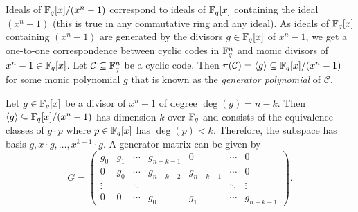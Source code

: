 \documentclass[../main.tex]{subfiles}
\begin{document}
Ideals of $\mathbb{F}_q[x] / (x^n - 1)$ correspond to ideals of $\mathbb{F}_q[x]$ containing the ideal $(x^n - 1)$ (this is true in any commutative ring and any ideal). As ideals of $\mathbb{F}_q[x]$ containing $(x^n - 1)$ are generated by the divisors $g \in \mathbb{F}_q[x]$ of $x^n - 1$, we get a one-to-one correspondence between cyclic codes in $\mathbb{F}_q^n$ and monic divisors of $x^n - 1 \in \mathbb{F}_q[x]$. Let $\mathcal{C} \subseteq \mathbb{F}_q^n$ be a cyclic code. Then $\pi(\mathcal{C}) = \langle g \rangle \subseteq \mathbb{F}_q[x] / (x^n - 1)$ for some monic polynomial $g$ that is known as the \emph{generator polynomial} of $\mathcal{C}$.

Let $g \in \mathbb{F}_q[x]$ be a divisor of $x^n - 1$ of degree $\deg(g) = n - k$. Then $\langle g \rangle \subseteq \mathbb{F}_q[x] / (x^n - 1)$ has dimension $k$ over $\mathbb{F}_q$ and consists of the equivalence classes of $g \cdot p$ where $p \in \mathbb{F}_q[x]$ has $\deg(p) < k$. Therefore, the subspace has basis $g, x \cdot g, \dots, x^{k - 1} \cdot g$. A generator matrix can be given by
\begin{equation*}
    G = \begin{pmatrix}
        g_0 & g_1 & \cdots & g_{n - k - 1} & 0 & \cdots & 0 \\
        0 & g_0 & \cdots & g_{n - k - 2} & g_{n - k - 1} & \cdots & 0 \\
        \vdots & & \ddots & & & \ddots & \vdots \\
        0 & 0 & \cdots & g_0 & g_1 & \cdots & g_{n - k - 1}
    \end{pmatrix}.
\end{equation*}
\end{document}
